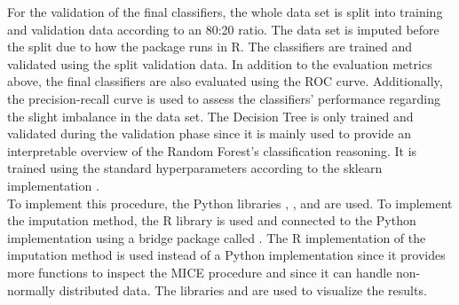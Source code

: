 For the validation of the final classifiers, the whole data set is split into 
training and validation data according to an 80:20 ratio. The data set is 
imputed before the split 
due to how the  package runs in R. The classifiers are 
trained and validated using the split validation data. 
In addition to the evaluation metrics above, the final classifiers are also 
evaluated using the ROC curve. Additionally, the 
precision-recall curve is used to assess the classifiers' performance 
regarding the slight imbalance in the data set. 
The Decision Tree is only trained and validated during the validation phase 
since it is mainly used to provide an interpretable overview of the Random 
Forest's classification reasoning. It is trained using the standard 
hyperparameters according to the sklearn implementation \cite{RN191}.
\\
To implement this procedure, the Python libraries , 
, and  are used. To implement the imputation method, 
the R library  
is used and connected to the Python implementation using a bridge package 
called . The R implementation of the imputation method is used 
instead of a Python implementation since it provides more functions to inspect 
the MICE procedure and since it can handle non-normally distributed data. The 
libraries  and  are used to visualize the 
results.

